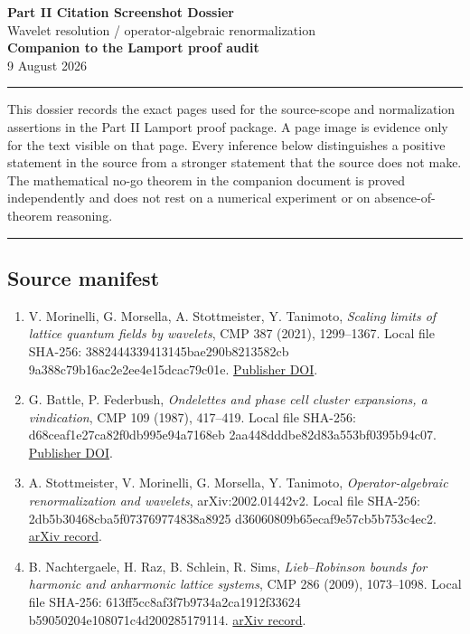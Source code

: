 \documentclass[11pt]{article}
\newenvironment{resultbox}{\begin{center}\begin{minipage}{0.94\textwidth}\hrule\vspace{6pt}}{\vspace{6pt}\hrule\end{minipage}\end{center}}
\begin{document}
\begin{center}
{\Large\bfseries Part II Citation Screenshot Dossier}\\[4pt]
{\large Wavelet resolution / operator-algebraic renormalization}\\[10pt]
\textbf{Companion to the Lamport proof audit}\\[10pt]
9 August 2026
\end{center}

\begin{resultbox}
This dossier records the exact pages used for the source-scope and normalization assertions
in the Part II Lamport proof package.  A page image is
evidence only for the text visible on that page.  Every inference below distinguishes a
positive statement in the source from a stronger statement that the source does not make.
The mathematical no-go theorem in the companion document is proved independently and
does not rest on a numerical experiment or on absence-of-theorem reasoning.
\end{resultbox}

\subsection*{Source manifest}

\begin{enumerate}
\item V. Morinelli, G. Morsella, A. Stottmeister, Y. Tanimoto,
\emph{Scaling limits of lattice quantum fields by wavelets}, CMP 387 (2021),
1299--1367.  Local file SHA-256:
{\footnotesize\ttfamily 3882444339413145bae290b8213582cb\newline
9a388c79b16ac2e2ee4e15dcac79c01e}.
\href{https://doi.org/10.1007/s00220-021-04152-5}{Publisher DOI}.

\item G. Battle, P. Federbush,
\emph{Ondelettes and phase cell cluster expansions, a vindication}, CMP 109
(1987), 417--419.  Local file SHA-256:
{\footnotesize\ttfamily d68ceaf1e27ca82f0db995e94a7168eb\newline
2aa448dddbe82d83a553bf0395b94c07}.
\href{https://doi.org/10.1007/BF01206144}{Publisher DOI}.

\item A. Stottmeister, V. Morinelli, G. Morsella, Y. Tanimoto,
\emph{Operator-algebraic renormalization and wavelets}, arXiv:2002.01442v2.
Local file SHA-256:
{\footnotesize\ttfamily 2db5b30468cba5f073769774838a8925\newline
d36060809b65ecaf9e57cb5b753c4ec2}.
\href{https://arxiv.org/abs/2002.01442}{arXiv record}.

\item B. Nachtergaele, H. Raz, B. Schlein, R. Sims,
\emph{Lieb--Robinson bounds for harmonic and anharmonic lattice systems},
CMP 286 (2009), 1073--1098.  Local file SHA-256:
{\footnotesize\ttfamily 613ff5cc8af3f7b9734a2ca1912f33624\newline
b59050204e108071c4d200285179114}.
\href{https://arxiv.org/abs/0712.3820}{arXiv record}.
\end{enumerate}
\end{document}
